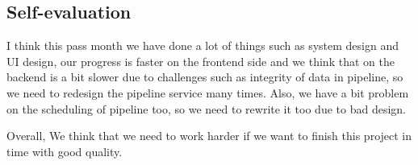 \subsection{Self-evaluation}

I think this pass month we have done a lot of things such as system design and UI design, our progress is faster on the frontend side
and we think that on the backend is a bit slower due to challenges such as integrity of data in pipeline, so we need to redesign the pipeline service many times.
Also, we have a bit problem on the scheduling of pipeline too, so we need to rewrite it too due to bad design.

Overall, We think that we need to work harder if we want to finish this project in time with good quality.